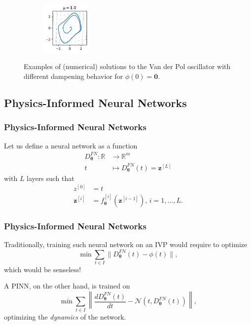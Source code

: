 \documentclass[t]{beamer}
\newcommand{\R}{\mathbb{R}}
\begin{document}
\begin{frame}
\begin{figure}[h]
\begin{subfigure}[b]{\textwidth}
	    \includegraphics[width=0.27\textwidth]{../images/vdp_statespace_mu_10.pdf}
	\end{subfigure}
	\caption{Examples of (numerical) solutions to the Van der Pol oscillator with different dampening behavior for $\phi(0)=\bm{0}$.}\label{fig:vdp_example}
    \end{figure}
\end{frame}

\subsection{Physics-Informed Neural Networks}

\begin{frame}
    \frametitle{Physics-Informed Neural Networks}
    Let us define a neural network as a function
    \begin{align*}
	D^{FN}_{\bm{\theta}}: \R &\longrightarrow \R^{m} \\
	t &\longmapsto 	D^{FN}_{\bm{\theta}}(	t) = \bm{z}^{[L]}
    \end{align*}
    with $L$ layers such that
    \begin{align*}
	z^{[0]} &= t \\
	\bm{z}^{[i]} &= f^{[i]}_{\bm{\theta}}\left( \bm{z}^{[i-1]} \right) ,\,i=1,\ldots,L
    .\end{align*}
\end{frame}

\begin{frame}
    \frametitle{Physics-Informed Neural Networks}
    Traditionally, training such neural network on an IVP would require to optimize \[
    \min \sum_{t\in I} \|D^{FN}_{\bm{\theta}}(t) - \phi(t)\|
    ,\] 
    which would be senseless! \pause

    A PINN, on the other hand, is trained on \[
    \min \sum_{t \in I} \left\|  \frac{d D^{FN}_{\bm{\theta}}(t)}{dt} - \mathcal{N}\left( t, D^{FN}_{\bm{\theta}}(t) \right) \right\| 
    ,\] 
    optimizing the \emph{dynamics} of the network.
\end{frame}
\end{document}
